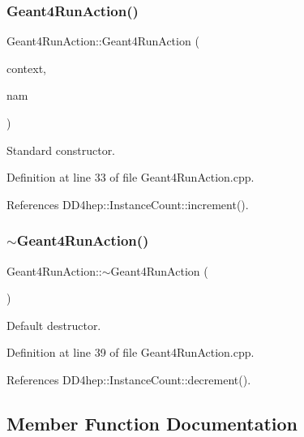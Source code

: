 \subsubsection{\texorpdfstring{Geant4\+Run\+Action()}{Geant4RunAction()}}
{\footnotesize\ttfamily Geant4\+Run\+Action\+::\+Geant4\+Run\+Action (\begin{DoxyParamCaption}\item[{\hyperlink{class_d_d4hep_1_1_simulation_1_1_geant4_context}{Geant4\+Context} $\ast$}]{context,  }\item[{const std\+::string \&}]{nam }\end{DoxyParamCaption})}



Standard constructor. 



Definition at line 33 of file Geant4\+Run\+Action.\+cpp.



References D\+D4hep\+::\+Instance\+Count\+::increment().

\hypertarget{class_d_d4hep_1_1_simulation_1_1_geant4_run_action_ac4db0a811956b595cfba64e2a210e290}{}\label{class_d_d4hep_1_1_simulation_1_1_geant4_run_action_ac4db0a811956b595cfba64e2a210e290} 
\subsubsection{\texorpdfstring{$\sim$\+Geant4\+Run\+Action()}{~Geant4RunAction()}}
{\footnotesize\ttfamily Geant4\+Run\+Action\+::$\sim$\+Geant4\+Run\+Action (\begin{DoxyParamCaption}{ }\end{DoxyParamCaption})\hspace{0.3cm}{\ttfamily [virtual]}}



Default destructor. 



Definition at line 39 of file Geant4\+Run\+Action.\+cpp.



References D\+D4hep\+::\+Instance\+Count\+::decrement().



\subsection{Member Function Documentation}
\hypertarget{class_d_d4hep_1_1_simulation_1_1_geant4_run_action_aeea4684e5d27e039b26734c3dbf3f65b}{}\label{class_d_d4hep_1_1_simulation_1_1_geant4_run_action_aeea4684e5d27e039b26734c3dbf3f65b} 
